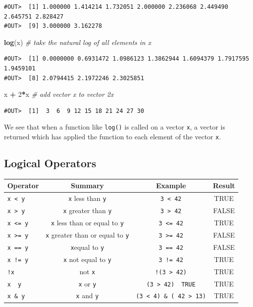 \documentclass[]{book}
\newenvironment{Shaded}{\begin{snugshade}}{\end{snugshade}}
\newcommand{\KeywordTok}[1]{\textcolor[rgb]{0.13,0.29,0.53}{\textbf{#1}}}
\newcommand{\DecValTok}[1]{\textcolor[rgb]{0.00,0.00,0.81}{#1}}
\newcommand{\StringTok}[1]{\textcolor[rgb]{0.31,0.60,0.02}{#1}}
\newcommand{\CommentTok}[1]{\textcolor[rgb]{0.56,0.35,0.01}{\textit{#1}}}
\newcommand{\OperatorTok}[1]{\textcolor[rgb]{0.81,0.36,0.00}{\textbf{#1}}}
\newcommand{\NormalTok}[1]{#1}
\begin{document}
\begin{verbatim}
#OUT>  [1] 1.000000 1.414214 1.732051 2.000000 2.236068 2.449490 2.645751 2.828427
#OUT>  [9] 3.000000 3.162278
\end{verbatim}

\begin{Shaded}
\begin{Highlighting}[]
\KeywordTok{log}\NormalTok{(x)    }\CommentTok{# take the natural log of all elements in x}
\end{Highlighting}
\end{Shaded}

\begin{verbatim}
#OUT>  [1] 0.0000000 0.6931472 1.0986123 1.3862944 1.6094379 1.7917595 1.9459101
#OUT>  [8] 2.0794415 2.1972246 2.3025851
\end{verbatim}

\begin{Shaded}
\begin{Highlighting}[]
\NormalTok{x }\OperatorTok{+}\StringTok{ }\DecValTok{2}\OperatorTok{*}\NormalTok{x   }\CommentTok{# add vector x to vector 2x}
\end{Highlighting}
\end{Shaded}

\begin{verbatim}
#OUT>  [1]  3  6  9 12 15 18 21 24 27 30
\end{verbatim}

We see that when a function like \texttt{log()} is called on a vector
\texttt{x}, a vector is returned which has applied the function to each
element of the vector \texttt{x}.

\subsection{Logical Operators}\label{logical-operators}

\begin{longtable}[]{@{}lccc@{}}
\toprule
Operator & Summary & Example & Result\tabularnewline
\midrule
\endhead
\texttt{x\ \textless{}\ y} & \texttt{x} less than \texttt{y} &
\texttt{3\ \textless{}\ 42} & TRUE\tabularnewline
\texttt{x\ \textgreater{}\ y} & \texttt{x} greater than \texttt{y} &
\texttt{3\ \textgreater{}\ 42} & FALSE\tabularnewline
\texttt{x\ \textless{}=\ y} & \texttt{x} less than or equal to
\texttt{y} & \texttt{3\ \textless{}=\ 42} & TRUE\tabularnewline
\texttt{x\ \textgreater{}=\ y} & \texttt{x} greater than or equal to
\texttt{y} & \texttt{3\ \textgreater{}=\ 42} & FALSE\tabularnewline
\texttt{x\ ==\ y} & \texttt{x}equal to \texttt{y} & \texttt{3\ ==\ 42} &
FALSE\tabularnewline
\texttt{x\ !=\ y} & \texttt{x} not equal to \texttt{y} &
\texttt{3\ !=\ 42} & TRUE\tabularnewline
\texttt{!x} & not \texttt{x} & \texttt{!(3\ \textgreater{}\ 42)} &
TRUE\tabularnewline
\texttt{x\ \textbar{}\ y} & \texttt{x} or \texttt{y} &
\texttt{(3\ \textgreater{}\ 42)\ \textbar{}\ TRUE} & TRUE\tabularnewline
\texttt{x\ \&\ y} & \texttt{x} and \texttt{y} &
\texttt{(3\ \textless{}\ 4)\ \&\ (\ 42\ \textgreater{}\ 13)} &
TRUE\tabularnewline
\bottomrule
\end{longtable}
\end{document}
